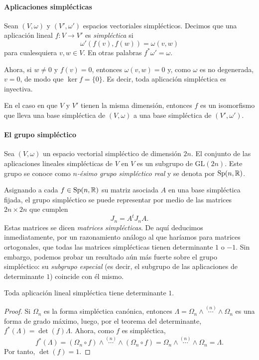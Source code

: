 \paragraph{\bf Aplicaciones simplécticas}\mbox{}

  Sean $(V,\omega)$ y $(V',\omega')$ espacios vectoriales simplécticos. Decimos que una aplicación lineal $f:V \rightarrow V'$ es \emph{simpléctica} si
  \[
    \omega'(f(v),f(w)) = \omega(v,w)
  \]
  para cualesquiera $v,w \in V$. En otras palabras $f^*\omega'=\omega$.

Ahora, si $w\neq 0$ y $f(v)=0$, entonces $\omega(v,w)=0$ y, como $\omega$ es no degenerada, $v=0$, de modo que $\ker f=\{0\}$. Es decir, toda aplicación simpléctica es inyectiva.

En el caso en que $V$ y $V'$ tienen la misma dimensión, entonces $f$ es un isomorfismo que lleva una base simpléctica de $(V,\omega)$ a una base simpléctica de $(V',\omega')$. 

\paragraph{\bf El grupo simpléctico}\mbox{}

  Sea $(V,\omega)$ un espacio vectorial simpléctico de dimensión $2n$. El conjunto de las aplicaciones lineales simplécticas de $V$ en $V$ es un subgrupo de $\mathrm{GL}(2n)$. Este grupo se conoce como \emph{$n$-ésimo grupo simpléctico real} y se denota por $\mathrm{Sp}(n,\mathbb{R})$.

  Asignando a cada $f\in \mathrm{Sp}(n,\mathbb{R})$ su matriz asociada $A$ en una base simpléctica fijada, el grupo simpléctico se puede representar por medio de las matrices $2n\times 2n$ que cumplen
  \begin{equation*}
    J_n=A^tJ_n A.
  \end{equation*}
  Estas matrices se dicen \emph{matrices simplécticas}.
  De aquí deducimos inmediatamente, por un razonamiento análogo al que haríamos para matrices ortogonales, que todas las matrices simplécticas tienen determinante $1$ o $-1$. Sin embargo, podemos probar un resultado aún más fuerte sobre el grupo simpléctico: su \emph{subgrupo especial} (es decir, el subgrupo de las aplicaciones de determinante $1$) coincide con él mismo.
\begin{prop}
  Toda aplicación lineal simpléctica tiene determinante $1$.
\end{prop}
\begin{proof}
  Si $\Omega_n$ es la forma simpléctica canónica, entonces $\Lambda=\Omega_n \wedge \overset{(n)}{\cdots} \wedge \Omega_n$ es una forma de grado máximo, luego, por el teorema del determinante, $f^*(\Lambda)=\det(f) \Lambda$. Ahora, como $f$ es simpléctica, 
  \begin{equation*}
    f^*(\Lambda) = (\Omega_n \circ f) \wedge \overset{(n)}{\cdots} \wedge (\Omega_n \circ f)=\Omega_n \wedge \overset{(n)}{\cdots} \wedge \Omega_n = \Lambda.
  \end{equation*}
  Por tanto, $\det(f)=1$.
\end{proof}
